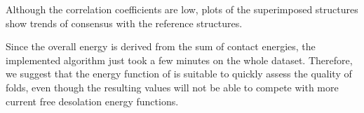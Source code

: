 \documentclass[11pt,a4paper]{article}
\begin{document}
Although the correlation coefficients are low, plots of the superimposed
structures show trends of consensus with the reference structures.

Since the overall energy is derived from the sum of contact energies,
the implemented algorithm just took a few minutes on the whole dataset.
Therefore, we suggest that the energy function of \citet{Zhang1997} is suitable
to quickly assess the quality of folds, even though the resulting values will not
be able to compete with more current free desolation energy functions.


%



\end{document}
